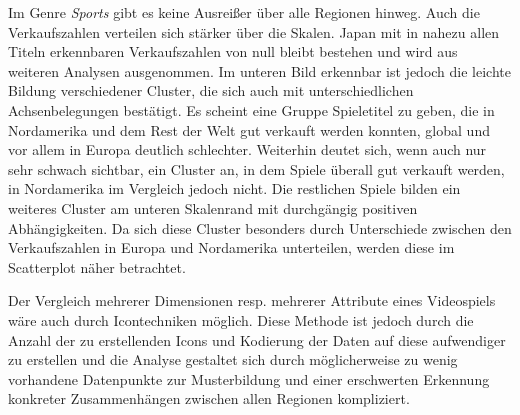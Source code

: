 \documentclass[usegeometry=true]{scrartcl}
\begin{document}
Im Genre \textit{Sports} gibt es keine Ausreißer über alle Regionen hinweg. Auch die Verkaufszahlen verteilen sich stärker über die Skalen. 
Japan mit in nahezu allen Titeln erkennbaren Verkaufszahlen von null bleibt bestehen und wird aus weiteren Analysen ausgenommen.
Im unteren Bild erkennbar ist jedoch die leichte Bildung verschiedener Cluster, die sich auch mit unterschiedlichen Achsenbelegungen bestätigt.
Es scheint eine Gruppe Spieletitel zu geben, die in Nordamerika und dem Rest der Welt gut verkauft werden konnten, global und vor allem in Europa deutlich schlechter.
Weiterhin deutet sich, wenn auch nur sehr schwach sichtbar, ein Cluster an, in dem Spiele überall gut verkauft werden, in Nordamerika im Vergleich jedoch nicht.
Die restlichen Spiele bilden ein weiteres Cluster am unteren Skalenrand mit durchgängig positiven Abhängigkeiten. 
Da sich diese Cluster besonders durch Unterschiede zwischen den Verkaufszahlen in Europa und Nordamerika unterteilen, werden diese im Scatterplot näher betrachtet. 

Der Vergleich mehrerer Dimensionen resp. mehrerer Attribute eines Videospiels wäre auch durch Icontechniken möglich. 
Diese Methode ist jedoch durch die Anzahl der zu erstellenden Icons und Kodierung der Daten auf diese aufwendiger zu erstellen und die Analyse
gestaltet sich durch möglicherweise zu wenig vorhandene Datenpunkte zur Musterbildung und einer erschwerten Erkennung konkreter Zusammenhängen zwischen allen Regionen kompliziert.

\end{document}
